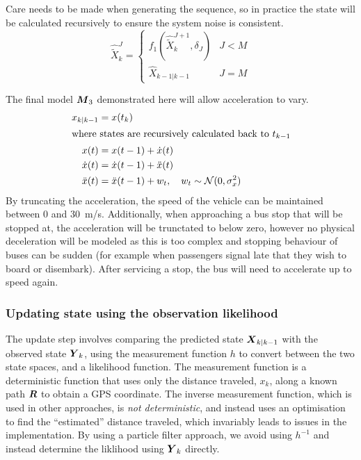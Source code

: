 Care needs to be made when generating the sequence,
so in practice the state will be calculated recursively to ensure
the system noise is consistent.
\begin{equation*}
\hat{\tilde X}_k^J =
\begin{cases}
    f_1(\hat{\tilde X}_k^{J+1}, \delta_J) & J < M \\
    \hat X_{k-1|k-1} & J = M
\end{cases}
\end{equation*}

The final model $\mbox{$\boldsymbol{M}$}_3$ demonstrated here will allow acceleration to vary.
\begin{align*}
\label{eq:model_m3}
x_{k|k-1} &= x(t_k) \\
\intertext{where states are recursively calculated back to $t_{k-1}$}
x(t) &= x(t - 1) + \dot x(t) \\
\dot x(t) &= \dot x(t-1) + \ddot x(t) \\
\ddot x(t) &= \ddot x(t-1) + w_t,\quad
w_t \sim \mathcal{N}(0,\sigma_x^2)
\end{align*}
By truncating the acceleration, 
the speed of the vehicle can be maintained between 0 and 30~m/s.
Additionally, when approaching a bus stop that will be stopped at,
the acceleration will be trunctated to below zero,
however no physical deceleration will be modeled as this is too complex
and stopping behaviour of buses can be sudden 
(for example when passengers signal late that they wish to board or disembark).
After servicing a stop, the bus will need to accelerate up to speed again. 


\subsubsection{Updating state using the observation likelihood}
\label{sec:pf_update}

The update step involves comparing the predicted state $\mbox{$\boldsymbol{X}$}_{k|k-1}$
with the observed state $\mbox{$\boldsymbol{Y}$}_k$,
using the measurement function $h$ to convert between the two state spaces,
and a likelihood function.
The measurement function is a deterministic function that uses only the 
distance traveled, $x_k$, along a known path $\boldsymbol{R}$ to obtain a GPS coordinate.
The inverse measurement function, which is used in other approaches,
is \emph{not deterministic}, and instead uses an optimisation to
find the ``estimated'' distance traveled,
which invariably leads to issues in the implementation.
By using a particle filter approach, we avoid using $h^{-1}$
and instead determine the liklihood using $\mbox{$\boldsymbol{Y}$}_k$ directly.


